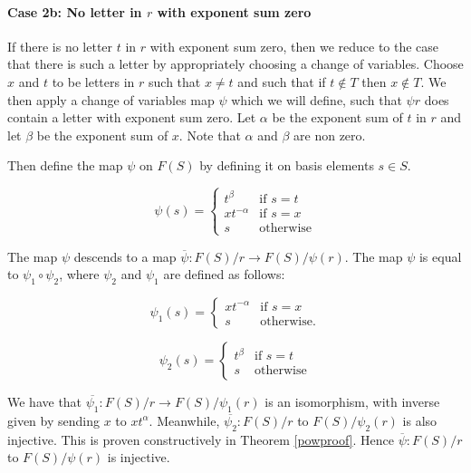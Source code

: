 \documentclass[12pt]{article} %
\theoremstyle{definition}
\theoremstyle{definition}
\theoremstyle{definition}
\theoremstyle{definition}
\begin{document}
\paragraph{Case 2b: No letter in $r$ with exponent sum zero}\label{noexpsumzero}

If there is no letter $t$ in $r$ with exponent sum zero, then we reduce to the case
that there is such a letter by appropriately choosing a change of variables. Choose $x$
and $t$ to be letters in $r$ such that $x \ne t$ and such that if $t \notin T$ then $x \notin T$.
We then apply a change of variables map $\psi$ which we will define, such that $\psi{r}$
does contain a letter with exponent sum zero.
Let $\alpha$ be the exponent sum
of $t$ in $r$ and let $\beta$ be the exponent sum of $x$.
Note that $\alpha$ and $\beta$ are non zero.

Then define the map $\psi$ on $F(S)$ by defining it on basis elements $s \in S$.

\begin{equation}
  \psi(s) =
  \begin{cases}
     t^\beta & \text{if }s = t \\
     xt^{-\alpha} &\text{if } s = x \\
     s & \text{otherwise}
  \end{cases}
\end{equation}

The map $\psi$ descends to a map $\overline{\psi}: F(S) / r \to F(S) / \psi(r)$. The map
$\psi$ is equal to $\psi_1 \circ \psi_2$,
where $\psi_2$ and $\psi_1$ are defined as follows:

\begin{equation}
  \psi_1(s) =
  \begin{cases}
     xt^{-\alpha} &\text{if } s = x \\
     s & \text{otherwise.}
  \end{cases}
\end{equation}

\begin{equation}
  \psi_2(s) =
  \begin{cases}
     t^\beta & \text{if } s = t \\
     s & \text{otherwise}
  \end{cases}
\end{equation}

We have that $\overline{\psi_1}: F(S) / r \to F(S) / \psi_1(r)$
is an isomorphism, with inverse given by sending $x$ to $xt^\alpha$. Meanwhile,
$\overline{\psi_2}: F(S) / r$ to $F(S) / \psi_2(r)$
is also injective.
This is proven constructively in Theorem \ref{powproof}.
Hence $\overline{\psi}: F(S) / r$ to $F(S) / \psi(r)$ is injective.
\end{document}
